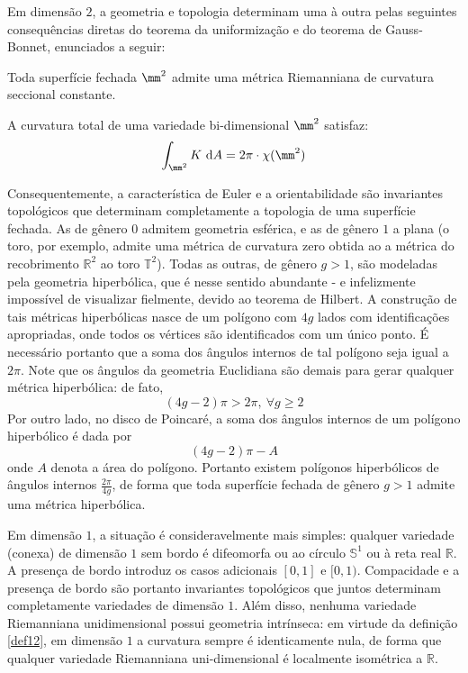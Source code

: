 Em dimensão $2$, a geometria e topologia determinam uma à outra pelas seguintes consequências diretas do teorema da uniformização e do teorema de Gauss-Bonnet, enunciados a seguir:
\begin{teorema}
Toda superfície fechada $\mm^2$ admite uma métrica Riemanniana de curvatura seccional constante.
\end{teorema}
\begin{teorema} A curvatura total de uma variedade bi-dimensional $\mm^2$ satisfaz:
\[
\int_{\mm^2} K \ \mathrm{d} A = 2 \pi \cdot \chi(\mm^2)
\]
\end{teorema}
Consequentemente, a característica de Euler e a orientabilidade são invariantes topológicos que determinam completamente a topologia de uma superfície fechada. As de gênero $0$ admitem geometria esférica, e as de gênero $1$ a plana (o toro, por exemplo, admite uma métrica de curvatura zero obtida ao  a métrica do recobrimento $\mathbb{R}^2$ ao toro $\mathbb{T}^2$). Todas as outras, de gênero $g >1$, são modeladas pela geometria hiperbólica, que é nesse sentido abundante - e infelizmente impossível de visualizar fielmente, devido ao teorema de Hilbert. A construção de tais métricas hiperbólicas nasce de um polígono com $4g$ lados com identificações apropriadas, onde todos os vértices são identificados com um único ponto. É necessário portanto que a soma dos ângulos internos de tal polígono seja igual a $2 \pi$. Note que os ângulos da geometria Euclidiana são  demais para gerar qualquer métrica hiperbólica: de fato, 
\[
(4g - 2) \pi > 2 \pi, \ \forall g \geq 2
\] Por outro lado, no disco de Poincaré, a soma dos ângulos internos de um polígono hiperbólico é dada por
$$(4g - 2) \pi - A$$
onde $A$ denota a área do polígono. Portanto existem polígonos hiperbólicos de ângulos internos $\frac{2 \pi}{4g}$, de forma que toda superfície fechada de gênero $g > 1$ admite uma métrica hiperbólica. 
\iffalse
\begin{figure}[H]
\centering
\texttt{[image: HypOct.png]}
\caption{octágono hiperbólico com identificações rotuladas que geram o bi-toro com geometria hiperbólica}
\end{figure}
\fi
\par 
Em dimensão $1$, a situação é consideravelmente mais simples: qualquer variedade (conexa) de dimensão $1$ sem bordo é difeomorfa ou ao círculo $\mathbb{S}^1$ ou à reta real $\mathbb{R}$. A presença de bordo introduz os casos adicionais $[0, 1]$ e $[0, 1)$. Compacidade e a presença de bordo são portanto invariantes topológicos que juntos determinam completamente variedades de dimensão $1$. Além disso, nenhuma variedade Riemanniana unidimensional possui geometria intrínseca: em virtude da definição \cref{def12}, em dimensão $1$ a curvatura sempre é identicamente nula, de forma que qualquer variedade Riemanniana uni-dimensional é localmente isométrica a $\mathbb{R}$.
